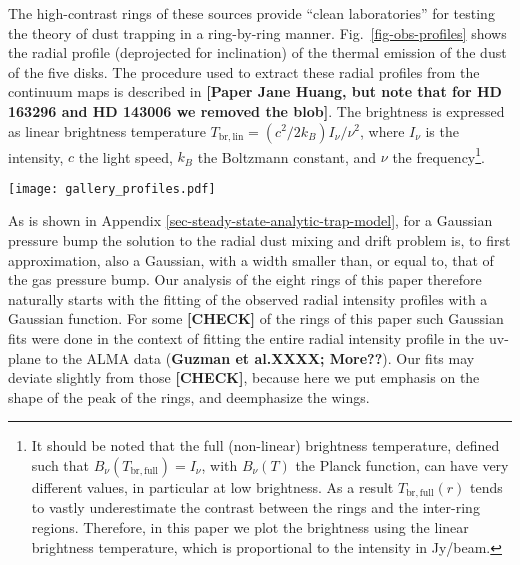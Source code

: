 \documentclass{aa}
\begin{document}
The high-contrast rings of these sources provide ``clean laboratories''
for testing the theory of dust trapping in a ring-by-ring manner.
Fig.\ \ref{fig-obs-profiles}
shows the radial profile (deprojected for
inclination) of the thermal emission of the dust of the five disks. The
procedure used to extract these radial profiles from the continuum maps
is described in {\bf [Paper Jane Huang, but note that for HD 163296 and
HD 143006 we removed the blob]}. The
brightness is expressed as linear brightness temperature
$T_{\mathrm{br,lin}}=(c^2/2k_B)I_\nu/\nu^2$, where $I_\nu$ is the
intensity, $c$ the light speed, $k_B$ the Boltzmann constant, and $\nu$ the
frequency\footnote{It should be noted that the full (non-linear) brightness temperature,
defined such that $B_\nu(T_{\mathrm{br,full}})=I_\nu$, with $B_\nu(T)$ the
Planck function, can have very different values, in particular at low
brightness. As a result $T_{\mathrm{br,full}}(r)$ tends to vastly
underestimate the contrast between the rings and the inter-ring
regions. Therefore, in this paper we plot the brightness using the linear
brightness temperature, which is proportional to the intensity in Jy/beam.}.

\begin{figure*}
\centerline{\texttt{[image: gallery\_profiles.pdf]}}
\caption{\label{fig-obs-profiles}The linear brightness temperature in
  band 6 of the five disks in our sample which have the most pronounced rings.
  The vertical axis is logarithmic to better show the contrast.
  The eight highest contrast rings are fitted by a Gaussian profile, shown
  as the solid inverse parabolas. The dotted inverse parabolas are Gaussians
  with the width of the ALMA beam. For a detailed description of these
  data, see {\bf Guzm\'an et al.~(2018)} for AS 209, {\bf XXXX}}
\end{figure*}

As is shown in Appendix \ref{sec-steady-state-analytic-trap-model}, for a
Gaussian pressure bump the solution to the radial dust mixing and drift problem
is, to first approximation, also a Gaussian, with a width smaller than, or equal
to, that of the gas pressure bump. Our analysis of the eight rings of this paper
therefore naturally starts with the fitting of the observed radial intensity
profiles with a Gaussian function. For some {\bf [CHECK]} of the rings of this
paper such Gaussian fits were done in the context of fitting the entire radial
intensity profile in the uv-plane to the ALMA data ({\bf Guzman et al.XXXX;
  More??}). Our fits may deviate slightly from those {\bf [CHECK]}, because here
we put emphasis on the shape of the peak of the rings, and deemphasize the
wings.
\end{document}
